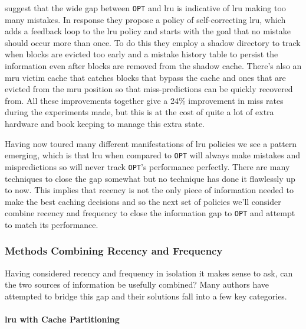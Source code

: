 \citet{kampeSelfCorrectingLRUReplacement2004} suggest that the wide gap between \texttt{OPT} and \gls{lru} is indicative of \gls{lru} making too many mistakes. In response they propose a policy of self-correcting \gls{lru}, which adds a feedback loop to the \gls{lru} policy and starts with the goal that no mistake should occur more than once. To do this they employ a shadow directory to track when blocks are evicted too early and a mistake history table to persist the information even after blocks are removed from the shadow cache. There's also an \gls{mru} victim cache that catches blocks that bypass the cache and ones that are evicted from the \gls{mru} position so that miss-predictions can be quickly recovered from. All these improvements together give a 24\% improvement in miss rates during the experiments made, but this is at the cost of quite a lot of extra hardware and book keeping to manage this extra state.

Having now toured many different manifestations of \gls{lru} policies we see a pattern emerging, which is that \gls{lru} when compared to \texttt{OPT} will always make mistakes and mispredictions so will never track \texttt{OPT}'s performance perfectly. There are many techniques to close the gap somewhat but no technique has done it flawlessly up to now. This implies that recency is not the only piece of information needed to make the best caching decisions and so the next set of policies we'll consider combine recency and frequency to close the information gap to \texttt{OPT} and attempt to match its performance.

\subsubsection{Methods Combining Recency and Frequency}

Having considered recency and frequency in isolation it makes sense to ask, can the two sources of information be usefully combined? Many authors have attempted to bridge this gap and their solutions fall into a few key categories. 

\paragraph{\gls{lru} with Cache Partitioning}


